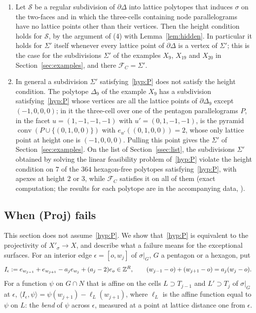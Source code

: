 \begin{remark}\label{rem:Sigmaheight}
\begin{enumerate}
\item Let $\mathcal S$ be a regular subdivision of $\partial\Delta$ into lattice polytopes that induces $\sigma$ on the two-faces and in which the
three-cells containing node parallelograms have no lattice points other than their vertices. Then the height condition holds for $\mathcal S$, by
the argument of (4) with Lemma~\ref{lem:hidden}. In particular it holds for $\Sigma'$ itself whenever every lattice point of $\partial\Delta$ is a
vertex of $\Sigma'$; this is the case for the subdivisions $\Sigma'$ of the examples $X_9$, $X_{19}$ and $X_{20}$ in Section~\ref{sec:examples}, and there
$\mathcal F_C=\Sigma'$.
\item In general a subdivision $\Sigma'$ satisfying~\ref{hyp:P} does not satisfy the height condition. The polytope $\Delta_9$ of the example
$X_9$ has a subdivision satisfying~\ref{hyp:P} whose vertices are all the lattice points of $\partial\Delta_9$ except $(-1,0,0,0)$; in it the three-cell over one of the pentagon parallelograms $P$, in the facet $u=(1,-1,-1,-1)$ with
$u'=(0,1,-1,-1)$, is the pyramid $\operatorname{conv}(P\cup\{(0,1,0,0)\})$ with $e_{u'}((0,1,0,0))=2$, whose only lattice point at height one is $(-1,0,0,0)$.
Pulling this point gives the $\Sigma'$ of Section~\ref{sec:examples}. On the list of Section~\ref{ssec:list}, the subdivisions $\Sigma'$
obtained by solving the linear feasibility problem of~\ref{hyp:P} violate the height condition on $7$ of the $364$ hexagon-free polytopes satisfying~\ref{hyp:P}, with apexes
at height $2$ or $3$, while $\mathcal F_C$ satisfies it on all of them (exact computation; the results for each polytope are in the accompanying data, \coderepo).
\end{enumerate}
\end{remark}

\subsection{When (Proj) fails}\label{ssec:proj}
This section does not assume~\ref{hyp:P}. We show that~\ref{hyp:P} is equivalent to the projectivity of $X'_\sigma\to X$, and describe what a failure
means for the exceptional surfaces. For an interior edge $\epsilon=[o,w_j]$ of $\sigma|_G$, $G$ a pentagon or a hexagon, put
\[
I_\epsilon:=e_{w_{j-1}}+e_{w_{j+1}}-a_je_{w_j}+(a_j-2)e_o\in\mathbb Z^R,\qquad (w_{j-1}-o)+(w_{j+1}-o)=a_j(w_j-o).
\]
For a function $\psi$ on $G\cap N$ that is affine on the cells $L\supset T_{j-1}$ and $L'\supset T_j$ of $\sigma|_G$ at $\epsilon$,
$\langle I_\epsilon,\psi\rangle=\psi(w_{j+1})-\ell_L(w_{j+1})$, where $\ell_L$ is the affine function equal to $\psi$ on $L$: the \emph{bend} of $\psi$
across $\epsilon$, measured at a point at lattice distance one from $\epsilon$.

